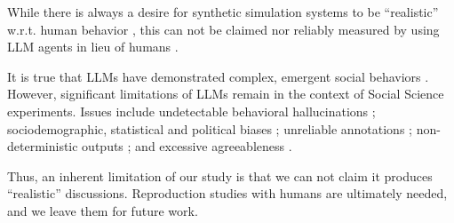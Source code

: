 While there is always a desire for synthetic simulation systems to be ``realistic'' w.r.t. human behavior \citet{grossman_2023, tornberg_2023, argyle2023}, this can not be claimed nor reliably measured by using LLM agents in lieu of humans \citep{rossi_2024}.

It is true that LLMs have demonstrated complex, emergent social behaviors \cite{Park2023GenerativeAI, demarzo_2023, leng_2024, abdelnabi_negotiations, abramski_2023, hewitt2024predicting, park2024generativeagentsimulations1000}. However, significant limitations of LLMs remain in the context of Social Science experiments. Issues include undetectable behavioral hallucinations \cite{rossi_2024}; sociodemographic, statistical and political biases \cite{anthis_2025,hewitt2024predicting,rossi_2024, Taubenfeld2024SystematicBI}; unreliable annotations \cite{jansen_2023,bisbee_2023,neumann_2025, Gligoric2024CanUL}; non-deterministic outputs \cite{atil_2025, bisbee_2023}; and excessive agreeableness \cite{Park2023GenerativeAI, anthis_2025, rossi_2024}.

Thus, an inherent limitation of our study is that we can not claim it produces ``realistic'' discussions. Reproduction studies with humans are ultimately needed, and we leave them for future work.